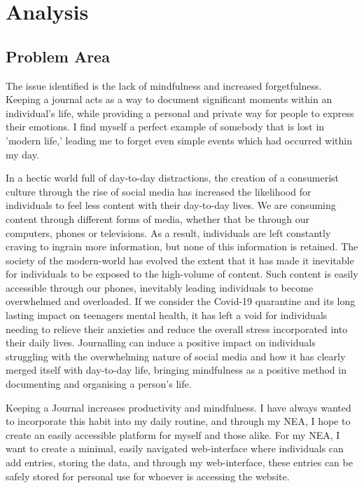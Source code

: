 \chapter{Analysis}


\section{Problem Area}

The issue identified is the lack of mindfulness and increased forgetfulness. Keeping a journal acts as a way to document significant moments within an individual's life, while providing a personal and private way for people to express their emotions. I find myself a perfect example of somebody that is lost in 'modern life,' leading me to forget even simple events which had occurred within my day. 

In a hectic world full of day-to-day distractions, the creation of a consumerist culture through the rise of social media has increased the likelihood for individuals to feel less content with their day-to-day lives. We are  consuming content through different forms of media, whether that be through our computers, phones or televisions. As a result, individuals are left constantly craving to ingrain more information, but none of this information is retained. The society of the modern-world has evolved the extent that it has made it inevitable for individuals to be exposed to the high-volume of content. Such content is easily accessible through our phones,  inevitably leading individuals to become overwhelmed and overloaded. If we consider the Covid-19 quarantine and its long lasting impact on teenagers mental health, \cite{Imran_Aamer_Sharif_Bodla_Naveed_2020} it has left a void for individuals needing to relieve their anxieties and reduce the overall stress incorporated into their daily lives. Journalling can induce a positive impact on individuals struggling with the overwhelming nature of social media and how it has clearly merged itself with day-to-day life, bringing mindfulness as a positive method in documenting and organising a person's life. 


Keeping a Journal increases productivity and mindfulness. I have always wanted to incorporate this habit into my daily routine, and through my NEA, I hope to create an easily accessible platform for myself and those alike. For my NEA, I want to create a minimal, easily navigated web-interface where individuals can add entries, storing the data, and through my web-interface, these entries can be safely stored for personal use for whoever is accessing the website. 

